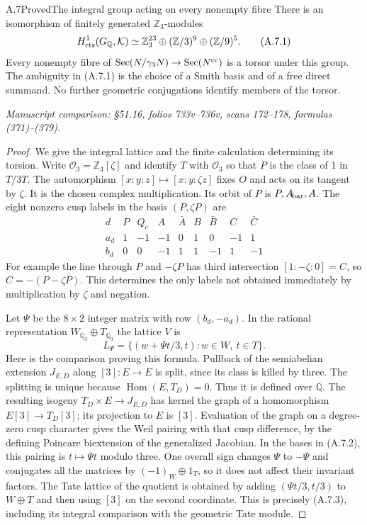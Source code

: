 \begin{statement}{A.7}{Proved}{The integral group acting on every nonempty fibre}
There is an isomorphism of finitely generated $\mathbb Z_3$-modules
\[
 H^1_{\rm cts}(G_{\mathbb Q},\mathcal K)
   \simeq\mathbb Z_3^{23}\oplus(\mathbb Z/3)^9
                         \oplus(\mathbb Z/9)^5.
 \tag{A.7.1}
\]
Every nonempty fibre of
$\operatorname{Sec}(N/\gamma_3N)\to\operatorname{Sec}(N^{\rm cc})$
is a torsor under this group. The ambiguity in (A.7.1) is the choice
of a Smith basis and of a free direct summand. No further geometric
conjugations identify members of the torsor.
\par\smallskip\noindent\emph{Manuscript comparison: \S51.16,
folios 733v--736v, scans 172--178, formulas (371)--(379).}
\end{statement}
\begin{proof}
We give the integral lattice and the finite calculation determining
its torsion. Write $\mathcal O_3=\mathbb Z_3[\zeta]$ and identify
$T$ with $\mathcal O_3$ so that $P$ is the class of $1$ in $T/3T$.
The automorphism $[x:y:z]\mapsto[x:y:\zeta z]$ fixes $O$ and
acts on its tangent by $\zeta$. It is the chosen complex
multiplication. Its orbit of $P$ is $P,A_{\!\rm bar},A$.
The eight nonzero cusp labels in the basis $(P,\zeta P)$ are
\[
\begin{array}{c|rrrrrrrr}
 d&P&Q_c&A&\bar A&B&\bar B&C&\bar C\\ \hline
 a_d&1&-1&-1&0&1&0&-1&1\\
 b_d&0&0&-1&1&1&-1&1&-1
\end{array}
\tag{A.7.2}
\]
For example the line through $P$ and $-\zeta P$ has third
intersection $[1:-\zeta:0]=C$, so
$C=-(P-\zeta P)$. This determines the only labels not obtained
immediately by multiplication by $\zeta$ and negation.

Let $\Psi$ be the $8\times2$ integer matrix with row $(b_d,-a_d)$.
In the rational representation $W_{\mathbb Q_3}\oplus T_{\mathbb Q_3}$
the lattice $V$ is
\[
 L_\Psi=\{(w+\Psi t/3,t):w\in W,\ t\in T\}.
 \tag{A.7.3}
\]
Here is the comparison proving this formula. Pullback of the
semiabelian extension $J_{E,D}$ along $[3]:E\to E$ is split, since
its class is killed by three. The splitting is unique because
$\operatorname{Hom}(E,T_D)=0$. Thus it is defined over $\mathbb Q$.
The resulting isogeny $T_D\times E\to J_{E,D}$ has kernel the graph
of a homomorphism $E[3]\to T_D[3]$; its projection to $E$ is $[3]$.
Evaluation of the graph on a degree-zero cusp character gives the
Weil pairing with that cusp difference, by the defining Poincare
biextension of the generalized Jacobian. In the bases in (A.7.2),
this pairing is $t\mapsto\Psi t$ modulo three. One overall sign
changes $\Psi$ to $-\Psi$ and conjugates all the matrices by
$(-1)_W\oplus1_T$, so it does not affect their invariant factors.
The Tate lattice of the quotient is obtained by adding
$(\Psi t/3,t/3)$ to $W\oplus T$ and then using $[3]$ on the second
coordinate. This is precisely (A.7.3), including its integral
comparison with the geometric Tate module.


\end{proof}
